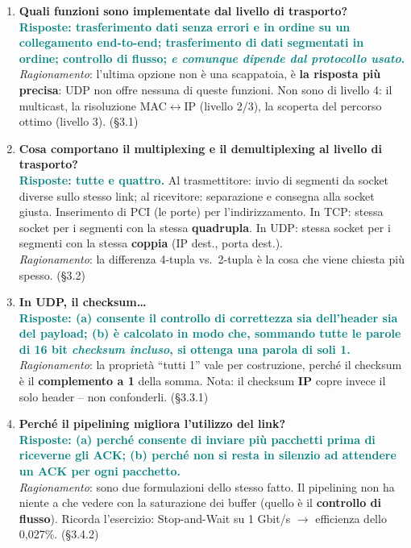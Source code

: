 \documentclass[12pt, a4paper]{article}
\begin{document}
\begin{enumerate}[leftmargin=*, resume]

\item \textbf{Quali funzioni sono implementate dal livello di trasporto?}\\
\textcolor{teal}{\textbf{Risposte: trasferimento dati senza errori e in ordine su un collegamento end-to-end; trasferimento di dati segmentati in ordine; controllo di flusso; \emph{e comunque dipende dal protocollo usato}.}}\\
\textit{Ragionamento}: l'ultima opzione non è una scappatoia, è \textbf{la risposta più precisa}: UDP non offre nessuna di queste funzioni. \textcolor{red!70!black}{Non} sono di livello 4: il multicast, la risoluzione MAC$\leftrightarrow$IP (livello 2/3), la scoperta del percorso ottimo (livello 3). (\S3.1)

\item \textbf{Cosa comportano il multiplexing e il demultiplexing al livello di trasporto?}\\
\textcolor{teal}{\textbf{Risposte: tutte e quattro.}} Al trasmettitore: invio di segmenti da socket diverse sullo stesso link; al ricevitore: separazione e consegna alla socket giusta. Inserimento di PCI (le porte) per l'indirizzamento. In TCP: stessa socket per i segmenti con la stessa \textbf{quadrupla}. In UDP: stessa socket per i segmenti con la stessa \textbf{coppia} (IP dest., porta dest.).\\
\textit{Ragionamento}: la differenza 4-tupla vs.\ 2-tupla è la cosa che viene chiesta più spesso. (\S3.2)

\item \textbf{In UDP, il checksum\dots}\\
\textcolor{teal}{\textbf{Risposte: (a) consente il controllo di correttezza sia dell'header sia del payload; (b) è calcolato in modo che, sommando tutte le parole di 16 bit \emph{checksum incluso}, si ottenga una parola di soli 1.}}\\
\textit{Ragionamento}: la proprietà ``tutti 1'' vale per costruzione, perché il checksum è il \textbf{complemento a 1} della somma. Nota: il checksum \textbf{IP} copre invece il solo header -- non confonderli. (\S3.3.1)

\item \textbf{Perché il pipelining migliora l'utilizzo del link?}\\
\textcolor{teal}{\textbf{Risposte: (a) perché consente di inviare più pacchetti prima di riceverne gli ACK; (b) perché non si resta in silenzio ad attendere un ACK per ogni pacchetto.}}\\
\textit{Ragionamento}: sono due formulazioni dello stesso fatto. Il pipelining non ha niente a che vedere con la saturazione dei buffer (quello è il \textbf{controllo di flusso}). Ricorda l'esercizio: Stop-and-Wait su 1 Gbit/s $\to$ efficienza dello 0,027\%. (\S3.4.2)


\end{enumerate}
\end{document}

